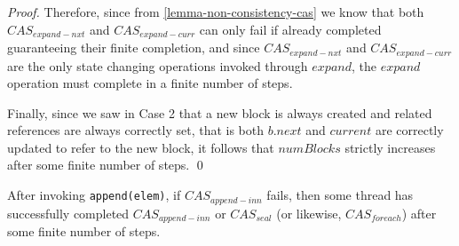 \documentclass[runningheads,a4paper]{llncs}
\begin{document}
\begin{proof}
Therefore, since from \ref{lemma-non-consistency-cas} we know that both
$CAS_{expand-nxt}$ and $CAS_{expand-curr}$ can only fail if already completed
guaranteeing their finite completion, and since $CAS_{expand-nxt}$ and 
$CAS_{expand-curr}$ are the only state changing operations invoked through
$expand$, the $expand$ operation must complete in a finite number of steps.

Finally, since we saw in Case 2 that a new block is always created and related
references are always correctly set, that is both $b.next $ and $current$ are
correctly updated to refer to the new block, it follows that $numBlocks$
strictly increases after some finite number of steps.
\qed
\end{proof}



\begin{lemma}\label{lemma-cas2} After invoking \verb=append(elem)=, if
$CAS_{append-inn}$ fails, then some thread has successfully completed 
$CAS_{append-inn}$ or $CAS_{seal}$ (or likewise, $CAS_{foreach}$) after some 
finite number of steps.
\end{lemma}
\end{document}
